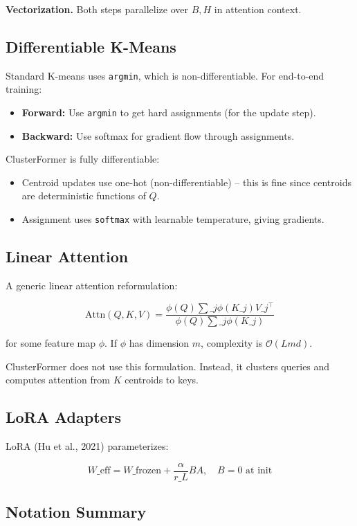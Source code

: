 \textbf{Vectorization.} Both steps parallelize over $B, H$ in attention context.

\subsection{Differentiable K-Means}

Standard K-means uses \texttt{argmin}, which is non-differentiable. For 
end-to-end training:

\begin{itemize}
\item \textbf{Forward:} Use \texttt{argmin} to get hard assignments (for the update step).
\item \textbf{Backward:} Use softmax for gradient flow through assignments.

\end{itemize}
ClusterFormer is fully differentiable:
\begin{itemize}
\item Centroid updates use one-hot (non-differentiable) -- this is fine since
  centroids are deterministic functions of $Q$.
\item Assignment uses \texttt{softmax} with learnable temperature, giving gradients.

\end{itemize}
\subsection{Linear Attention}

A generic linear attention reformulation:

\[
\text{Attn}(Q, K, V) = \frac{\phi(Q) \sum\_j \phi(K\_j) V\_j^\top}{\phi(Q) \sum\_j \phi(K\_j)}
\]

for some feature map $\phi$. If $\phi$ has dimension $m$, complexity is 
$\mathcal{O}(L m d)$.

ClusterFormer does not use this formulation. Instead, it clusters queries 
and computes attention from $K$ centroids to keys.

\subsection{LoRA Adapters}

LoRA (Hu et al., 2021) parameterizes:

\[
W\_\text{eff} = W\_\text{frozen} + \frac{\alpha}{r\_L} B A, \quad B = 0 \text{ at init}
\]

\subsection{Notation Summary}

